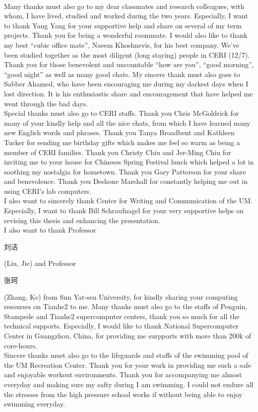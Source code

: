 \\
Many thanks must also go to my dear classmates and research colleagues, with whom, I have lived, studied and worked during the two years. Especially, I want to thank Yang Yang for your supportive help and share on several of my term projects. Thank you for being a wonderful roommate. I would also like to thank my best ``cubic office mate'', Naeem Khoshnevis, for his best company. We've been studied together as the most diligent (long staying) people in CERI (12/7). Thank you for those benevolent and uncountable ``how are you'', ``good morning'', ``good night'' as well as many good chats. My sincere thank must also goes to Sabber Ahamed, who have been encouraging me during my darkest days when I lost direction. It is his enthusiastic share and encouragement that have helped me went through the bad days. 
\\
Special thanks must also go to CERI staffs. Thank you Chris McGoldrick for many of your kindly help and all the nice chats, from which I have learned many new English words and phrases. Thank you Tanya Broadbent and Kathleen Tucker for sending me birthday gifts which makes me feel so warm as being a member of CERI families. Thank you Christy Chiu and Jer-Ming Chiu for inviting me to your house for Chineses Spring Festival lunch which helped a lot in soothing my nostalgia for hometown. Thank you Gary Patterson for your share and benevolence. Thank you Deshone Marshall for constantly helping me out in using CERI's lab computers.
\\
I also want to sincerely thank Center for Writing and Communication of the UM. Especially, I want to thank Bill Schraufnagel for your very supportive helps on revising this thesis and enhancing the presentation.
\\
I also want to thank Professor \begin{CJK}{UTF8}{gbsn}刘洁\end{CJK} (Liu, Jie) and Professor \begin{CJK}{UTF8}{gbsn}张珂\end{CJK} (Zhang, Ke) from Sun Yat-sen University, for kindly sharing your computing resourses on Tianhe2 to me. Many thanks must also go to the staffs of Penguin, Stampede and Tianhe2 supercomputer centers, thank you so much for all the technical supports. Especially, I would like to thank National Supercomputer Center in Guangzhou, China, for providing me surpports with more than 200k of core-hours. 
\\
Sincere thanks must also go to the lifeguards and staffs of the swimming pool of the UM Recreation Center. Thank you for your work in providing me such a safe and enjoyable workout environments. Thank you for accompanying me almost everyday and making sure my safty during I am swimming. I could not endure all the stresses from the high pressure school works if without being able to enjoy swimming everyday.  
